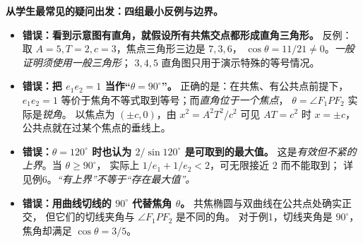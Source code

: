 \clearpage
\begin{trapbox}
\textbf{从学生最常见的疑问出发：四组最小反例与边界。}
\begin{itemize}
\item \textbf{错误：看到示意图有直角，就假设所有共焦交点都形成直角三角形。}
反例：取 $A=5,T=2,c=3$，焦点三角形三边是 $7,3,6$，
$\cos\theta=11/21\ne0$。\emph{一般证明须使用一般三角形}；
$3,4,5$ 直角图只用于演示特殊的等号情况。

\item \textbf{错误：把 $e_1e_2=1$ 当作“$\theta=90^\circ$”。}
正确的是：在共焦、有公共点前提下，$e_1e_2=1$
等价于焦角不等式取到等号；而\emph{直角位于一个焦点}，
$\theta=\angle F_1PF_2$ 实际是\emph{锐角}。
以焦点为 $(\pm c,0)$，由 $x^2=A^2T^2/c^2$ 可见
$AT=c^2$ 时 $x=\pm c$，公共点就在过某个焦点的垂线上。

\item \textbf{错误：$\theta=120^\circ$ 时也认为
$2/\sin120^\circ$ 是可取到的最大值。}
这是\emph{有效但不紧的上界}。当 $\theta\ge90^\circ$，
实际上 $1/e_1+1/e_2<2$，可无限接近 $2$ 而不能取到；
详见例6。\emph{“有上界”不等于“存在最大值”。}

\item \textbf{错误：用曲线切线的 $90^\circ$ 代替焦角 $\theta$。}
共焦椭圆与双曲线在公共点处确实正交，
但它们的切线夹角与 $\angle F_1PF_2$ 是不同的角。
对于例1，切线夹角是 $90^\circ$，焦角却满足
$\cos\theta=3/5$。
\end{itemize}
\end{trapbox}
